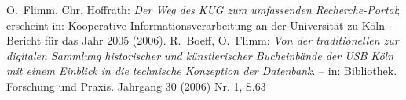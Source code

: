 \documentclass[11pt, twoside, a4paper, BCOR8mm, DIV12, bibtotoc,idxtotoc]{scrbook}
\begin{document}
\begin{thebibliography}{ChBr82}
\originalTeX

 O.~Flimm, Chr. Hoffrath: \emph{Der
    Weg des KUG zum umfassenden Recherche-Portal}; erscheint in:
  Kooperative Informationsverarbeitung an der Universität zu Köln -
  Bericht für das Jahr 2005 (2006).
 R.~Boeff, O.~Flimm: \emph{Von
    der traditionellen zur digitalen Sammlung historischer und
    künstlerischer Bucheinbände der USB Köln mit einem Einblick in die
    technische Konzeption der Datenbank}. -- in: Bibliothek. Forschung
  und Praxis. Jahrgang 30 (2006) Nr. 1, S.63
\end{thebibliography}
\germanTeX
\end{document}

